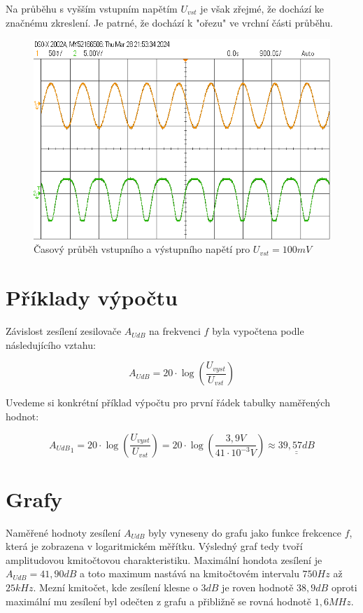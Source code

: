 \documentclass[a4paper, czech]{article}
\begin{document}
Na průběhu s vyšším vstupním napětím $U_{vst}$ je však zřejmé, že dochází ke značnému zkreslení. Je patrné, že dochází k "ořezu" ve vrchní části průběhu.

\begin{figure}[H]
    \centering
    \includegraphics{prubeh_100mVpp.png}
    \caption{Časový průběh vstupního a výstupního napětí pro $U_{vst} =  100 mV$}
\end{figure}

\section{Příklady výpočtu}

Závislost zesílení zesilovače $A_{UdB}$ na frekvenci $f$ byla vypočtena podle následujícího vztahu:

$$A_{UdB}=20 \cdot \log\left(\frac{U_{vyst}}{U_{vst}}\right)$$

Uvedeme si konkrétní příklad výpočtu pro první řádek tabulky naměřených hodnot:

$${A_{UdB}}_1 = 20 \cdot \log\left(\frac{U_{vyst}}{U_{vst}}\right) = 20 \cdot \log\left(\frac{3,9 V}{41 \cdot 10^{-3}V}\right) \approx \underline{\underline{39,57 dB}}$$

\section{Grafy}

Naměřené hodnoty zesílení $A_{UdB}$ byly vyneseny do grafu jako funkce frekcence $f$, která je zobrazena v logaritmickém měřítku. Výsledný graf tedy tvoří amplitudovou kmitočtovou charakteristiku.
Maximální hondota zesílení je $A_{UdB} = 41,90dB$ a toto maximum nastává na kmitočtovém intervalu $750 Hz$ až $25 kHz$.
Mezní kmitočet, kde zesílení klesne o $3 dB$ je roven hodnotě $38,9 dB$ oproti maximální mu zesílení byl odečten z grafu a přibližně se rovná hodnotě $1,6 MHz$.
\end{document}
